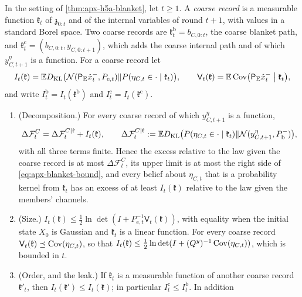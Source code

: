 \begin{proposition}\label{prop:apx-blanket-reference}
In the setting of \cref{thm:apx-h5a-blanket}, let $t\ge1$. A \emph{coarse record} is a measurable function $\mathfrak k_t$ of $\mathfrak z_{0:t}$ and of the internal variables of round $t+1$, with values in a standard Borel space. Two coarse records are $\mathfrak k^{\mathrm b}_t=b_{C,0:t}$, the coarse blanket path, and $\mathfrak k^{\mathrm c}_t=(b_{C,0:t},y_{C,0:t+1})$, which adds the coarse internal path and of which $y^\eta_{C,t+1}$ is a function. For a coarse record let
\begin{equation*}
I_t(\mathfrak k)=\mathbb{E}D_{\mathrm{KL}}\bigl(\mathcal{N}(\mathsf P_{\mathrm E}\hat x^-_t,P_{\mathrm e,t})\Vert P(\eta_{C,t}\in\cdot\mid\mathfrak k_t)\bigr),\qquad\mathsf V_t(\mathfrak k)=\mathbb{E}\operatorname{Cov}\bigl(\mathsf P_{\mathrm E}\hat x^-_t\bigm|\mathfrak k_t\bigr),
\end{equation*}
and write $I^{\mathrm b}_t=I_t(\mathfrak k^{\mathrm b})$ and $I^{\mathrm c}_t=I_t(\mathfrak k^{\mathrm c})$.
\begin{enumerate}
\item[(a)] (Decomposition.) For every coarse record of which $y^\eta_{C,t+1}$ is a function,
\begin{equation}\label{eq:apx-blanket-decomposition}
\Delta\mathcal F^C_t=\Delta\mathcal F^{C\mid\mathfrak k}_t+I_t(\mathfrak k),\qquad\Delta\mathcal F^{C\mid\mathfrak k}_t:=\mathbb{E}D_{\mathrm{KL}}\bigl(P(\eta_{C,t}\in\cdot\mid\mathfrak k_t)\Vert\mathcal{N}(y^\eta_{C,t+1},P^-_{\mathrm b})\bigr),
\end{equation}
with all three terms finite. Hence the excess relative to the law given the coarse record is at most $\Delta\mathcal F^C_t$, its upper limit is at most the right side of \eqref{eq:apx-blanket-bound}, and every belief about $\eta_{C,t}$ that is a probability kernel from $\mathfrak k_t$ has an excess of at least $I_t(\mathfrak k)$ relative to the law given the members' channels.
\item[(b)] (Size.) $I_t(\mathfrak k)\le\frac12\ln\det(I+P_{\mathrm e,t}^{-1}\mathsf V_t(\mathfrak k))$, with equality when the initial state $X_0$ is Gaussian and $\mathfrak k_t$ is a linear function. For every coarse record $\mathsf V_t(\mathfrak k)\preceq\operatorname{Cov}(\eta_{C,t})$, so that $I_t(\mathfrak k)\le\frac12\ln\det(I+(Q^y)^{-1}\operatorname{Cov}(\eta_{C,t}))$, which is bounded in $t$.
\item[(c)] (Order, and the leak.) If $\mathfrak k_t$ is a measurable function of another coarse record $\mathfrak k'_t$, then $I_t(\mathfrak k')\le I_t(\mathfrak k)$; in particular $I^{\mathrm c}_t\le I^{\mathrm b}_t$. In addition

\end{enumerate}
\end{proposition}
